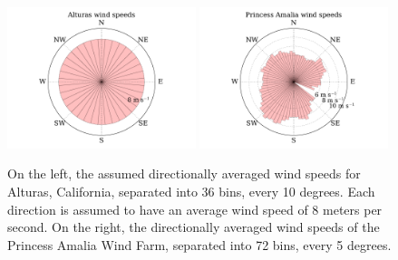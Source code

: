 \documentclass[WESD, manuscript]{copernicus}
\begin{document}
\begin{figure}[htbp]
  \centering
  \includegraphics[width=0.49\textwidth]{Figures/alturas_speeds.pdf}
  \includegraphics[width=0.49\textwidth]{Figures/amalia_speeds.pdf}
  \caption{\label{wind_speeds} On the left, the assumed directionally averaged wind speeds for Alturas, California, separated into 36 bins, every 10 degrees. Each direction is assumed to have an average wind speed of 8 meters per second. On the right, the directionally averaged wind speeds of the Princess Amalia Wind Farm, separated into 72 bins, every 5 degrees.}
\end{figure}
\end{document}
